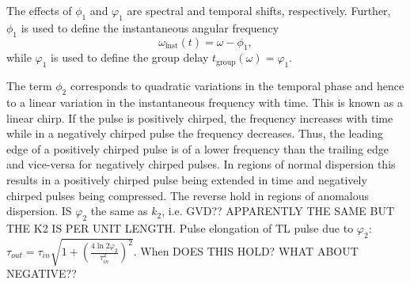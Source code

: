 \documentclass[a4paper]{jpconf}
\begin{document}
The effects of $\phi_1$ and $\varphi_1$ are spectral and temporal shifts, respectively. Further, $\phi_1$ is used to define the instantaneous angular frequency 
\begin{equation}
\omega_\text{inst}(t) = \omega - \phi_1,
\end{equation}  
while $\varphi_1$ is used to define the group delay $t_\text{group}(\omega) = \varphi_1$. \par 
The term $\phi_2$ corresponds to quadratic variations in the temporal phase and hence to a linear variation in the instantaneous frequency with time. This is known as a linear chirp. If the pulse is positively chirped, the frequency increases with time while in a negatively chirped pulse the frequency decreases. Thus, the leading edge of a positively chirped pulse is of a lower frequency than the trailing edge and vice-versa for negatively chirped pulses.  In regions of normal dispersion this results in a positively chirped pulse being extended in time and negatively chirped pulses being compressed. The reverse hold in regions of anomalous dispersion. IS $\varphi_2$ the same as $k_2$, i.e. GVD?? APPARENTLY THE SAME BUT THE K2 IS PER UNIT LENGTH. Pulse elongation of TL pulse due to $\varphi_2$:
$\tau_{out} = \tau_{in} \sqrt{1+ \left( \frac{4 \ln 2 \varphi_2}{\tau_{in}^2} \right)^2}$. When DOES THIS HOLD? WHAT ABOUT NEGATIVE??
\end{document}

